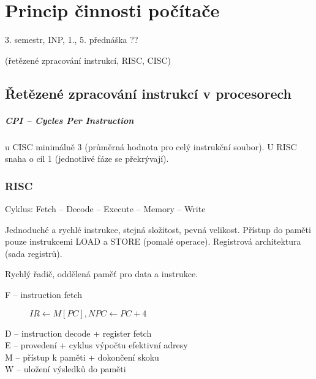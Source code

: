 \documentclass[a4paper, 11pt]{report}
\begin{document}
\chapter{Princip činnosti počítače} \label{cha:7}

3. semestr, INP, 1., 5. přednáška ??

(řetězené zpracování instrukcí, RISC, CISC)

\section{Řetězené zpracování instrukcí v procesorech}

\paragraph{CPI -- Cycles Per Instruction} u CISC minimálně 3 (průměrná hodnota pro celý instrukční soubor). U RISC snaha o cíl 1 (jednotlivé fáze se překrývají).

\subsection{RISC}
Cyklus: Fetch -- Decode -- Execute -- Memory -- Write

Jednoduché a rychlé instrukce, stejná složitost, pevná velikost. Přístup do paměti pouze instrukcemi LOAD a STORE (pomalé operace). Registrová architektura (sada registrů).

Rychlý řadič, oddělená paměť pro data a instrukce.

\begin{description}
	\item[F -- instruction fetch] $IR \gets M[PC], NPC \gets PC+4$
	\item[D -- instruction decode + register fetch] 
	\item[E -- provedení + cyklus výpočtu efektivní adresy]
	\item[M -- přístup k paměti + dokončení skoku]
	\item[W -- uložení výsledků do paměti]
\end{description}
\end{document}
